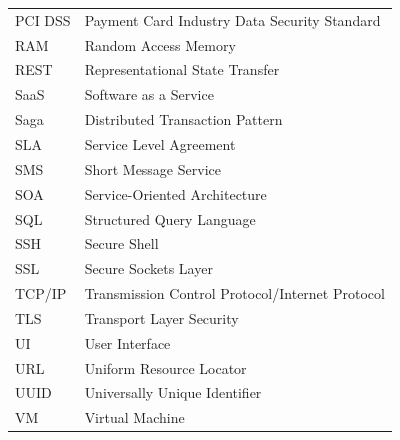 \begin{table}[h]
\begin{tabular}{ll}
PCI DSS & Payment Card Industry Data Security Standard \\
RAM & Random Access Memory \\
REST & Representational State Transfer \\
SaaS & Software as a Service \\
Saga & Distributed Transaction Pattern \\
SLA & Service Level Agreement \\
SMS & Short Message Service \\
SOA & Service-Oriented Architecture \\
SQL & Structured Query Language \\
SSH & Secure Shell \\
SSL & Secure Sockets Layer \\
TCP/IP & Transmission Control Protocol/Internet Protocol \\
TLS & Transport Layer Security \\
UI & User Interface \\
URL & Uniform Resource Locator \\
UUID & Universally Unique Identifier \\
VM & Virtual Machine \\
\bottomrule
\end{tabular}
\end{table}

